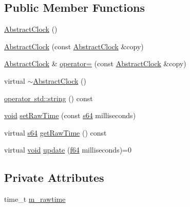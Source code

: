 \subsection*{Public Member Functions}
\begin{DoxyCompactItemize}
\item 
\mbox{\hyperlink{classnjli_1_1_abstract_clock_adf1ecfb49abca618253d605ff43a212b}{Abstract\+Clock}} ()
\item 
\mbox{\hyperlink{classnjli_1_1_abstract_clock_a3c605a41c8f527a61c2226b2dba6bba4}{Abstract\+Clock}} (const \mbox{\hyperlink{classnjli_1_1_abstract_clock}{Abstract\+Clock}} \&copy)
\item 
\mbox{\hyperlink{classnjli_1_1_abstract_clock}{Abstract\+Clock}} \& \mbox{\hyperlink{classnjli_1_1_abstract_clock_a3cdd1200a3ef9bd0a5748ab3e7c2ad7b}{operator=}} (const \mbox{\hyperlink{classnjli_1_1_abstract_clock}{Abstract\+Clock}} \&copy)
\item 
virtual \mbox{\hyperlink{classnjli_1_1_abstract_clock_a41aac7ee2287261e3b9e7fff9863f821}{$\sim$\+Abstract\+Clock}} ()
\item 
\mbox{\hyperlink{classnjli_1_1_abstract_clock_a95ea44479f55856a0b356edc5a2ad111}{operator std\+::string}} () const
\item 
\mbox{\hyperlink{_thread_8h_af1e856da2e658414cb2456cb6f7ebc66}{void}} \mbox{\hyperlink{classnjli_1_1_abstract_clock_ad837eada8b3deafe40d6a2e27efa048a}{set\+Raw\+Time}} (const \mbox{\hyperlink{_util_8h_a4258bfb2c3a440d06c4aaa3c2b450dde}{s64}} milliseconds)
\item 
virtual \mbox{\hyperlink{_util_8h_a4258bfb2c3a440d06c4aaa3c2b450dde}{s64}} \mbox{\hyperlink{classnjli_1_1_abstract_clock_ada0417b7564b9cdee7357191f33ea448}{get\+Raw\+Time}} () const
\item 
virtual \mbox{\hyperlink{_thread_8h_af1e856da2e658414cb2456cb6f7ebc66}{void}} \mbox{\hyperlink{classnjli_1_1_abstract_clock_a06401048780f7b9522187731d3a97579}{update}} (\mbox{\hyperlink{_util_8h_a94dab5770726ccbef8c7d026cfbdf8e5}{f64}} milliseconds)=0
\end{DoxyCompactItemize}
\subsection*{Private Attributes}
\begin{DoxyCompactItemize}
\item 
time\+\_\+t \mbox{\hyperlink{classnjli_1_1_abstract_clock_a668e9ea61bf8c76643255af6b65f2a59}{m\+\_\+rawtime}}
\end{DoxyCompactItemize}


